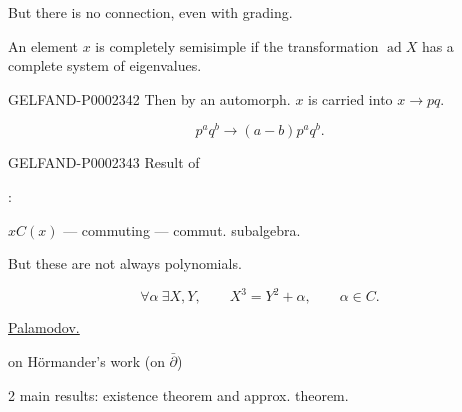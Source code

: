 But there is no connection, even with grading.



An element $x$ is completely semisimple if the transformation $\operatorname{ad}X$ has a complete system of eigenvalues.



\begin{GelfandAdjacentEvidence}{GELFAND-P000234}{2}
Then by an automorph. $x$ is carried into $x\to pq$.




\end{GelfandAdjacentEvidence}

\begin{equation*}
 p^a q^b\to (a-b)p^a q^b.
\end{equation*}



\begin{GelfandAdjacentEvidence}{GELFAND-P000234}{3}
Result of 

:

$x$\qquad $C (x)$ — commuting — commut. subalgebra.
\end{GelfandAdjacentEvidence}



But these are not always polynomials.



\begin{equation*}
 \forall\alpha\ \exists X, Y,\qquad X^3=Y^2+\alpha,\qquad \alpha\in C.
\end{equation*}



\underline{Palamodov.}



on Hörmander's work (on $\bar\partial$)



2 main results: existence theorem and approx. theorem.




